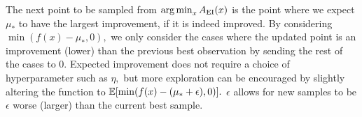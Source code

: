 The next point to be sampled from $\operatorname*{arg\,min}_{x} A_\mathrm{EI}(x)$ is the point
where we expect $\mu_*$ to have the largest improvement, if it is indeed 
improved. By considering $\min(f(x) - \mu_*, 0),$ we only consider the cases 
where the
updated point is an improvement (lower) than the previous best observation by
sending the rest of the cases to 0. Expected improvement does not require a
choice of hyperparameter such as $\eta,$ but more exploration can be 
encouraged by slightly altering the function to 
$\operatorname{\mathbb{E}}[\min(f(x) - (\mu_* + \epsilon), 0)].$ $\epsilon$ allows for
new samples to be $\epsilon$ worse (larger) than the current best sample.

